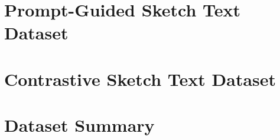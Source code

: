 

\section{Prompt-Guided Sketch Text Dataset} \label{datav1}


\section{Contrastive Sketch Text Dataset} \label{datav2}


\section{Dataset Summary} \label{datasummary}

